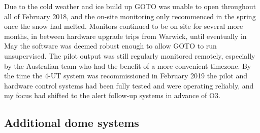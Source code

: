 \begin{colsection}
\begin{colsection}
Due to the cold weather and ice build up GOTO was unable to open throughout all of February 2018, and the on-site monitoring only recommenced in the spring once the snow had melted. Monitors continued to be on site for several more months, in between hardware upgrade trips from Warwick, until eventually in May the software was deemed robust enough to allow GOTO to run unsupervised. The pilot output was still regularly monitored remotely, especially by the Australian team who had the benefit of a more convenient timezone. By the time the 4-UT system was recommissioned in February 2019 the pilot and hardware control systems had been fully tested and were operating reliably, and my focus had shifted to the alert follow-up systems in advance of O3.

\end{colsection}


\newpage
\subsection{Additional dome systems}
\label{sec:arduino}
\begin{colsection}


\end{colsection}
\end{colsection}
